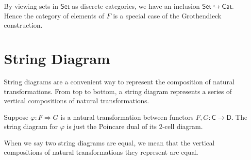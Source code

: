 By viewing sets in $\mathsf{Set}$ as discrete categories, we have an inclusion $\mathsf{Set}\hookrightarrow\mathsf{Cat}$. Hence the category of elements of $F$ is a special case of the Grothendieck construction.


\section{String Diagram}
String diagrams are a convenient way to represent the composition of natural transformations. From top to bottom, a string diagram represents a series of vertical compositions of natural transformations. 

Suppose $\varphi:F\Rightarrow G$ is a natural transformation between functors $F,G:\mathsf{C}\to \mathsf{D}$. The string diagram for $\varphi$ is just the Poincare dual of its 2-cell diagram. 

\begin{center}
    \hspace{1cm}
\end{center}

When we say two string diagrams are equal, we mean that the vertical compositions of natural transformations they represent are equal.

